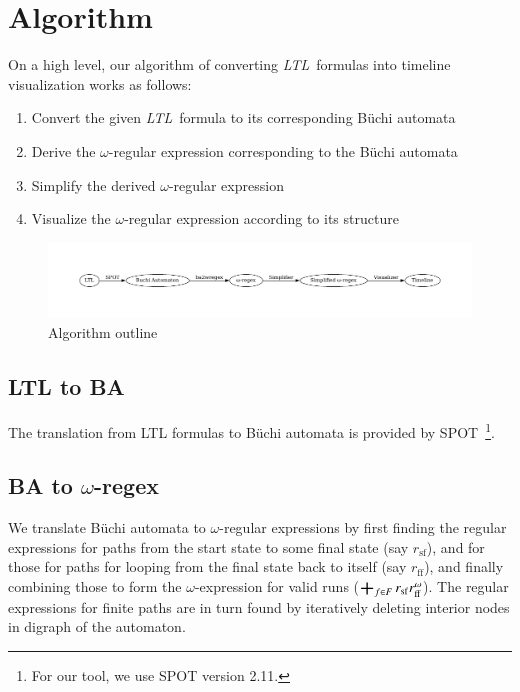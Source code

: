 \documentclass[preprint,12pt]{elsarticle}
\theoremstyle{definition}
\theoremstyle{remark}
\DeclareMathOperator*{\bigplus}{\scalerel*{+}{\sum}}
\newcommand{\ltl}{\textit{LTL}}
\newcommand{\Buchi}{B\"{u}chi }
\begin{document}
\section{Algorithm}
On a high level, our algorithm of converting \ltl\ formulas into timeline visualization works as follows:
\begin{enumerate}
    \item Convert the given \ltl\ formula to its corresponding \Buchi automata %
    \item Derive the $\omega$-regular expression corresponding to the \Buchi automata %
    \item Simplify the derived $\omega$-regular expression %
    \item Visualize the $\omega$-regular expression according to its structure %
\end{enumerate}
\begin{figure}[!h]
    \centering
    \includegraphics[width=\textwidth]{img/algorithm_outline.pdf}
    \caption{Algorithm outline}
    \label{fig:algo}
\end{figure}

\subsection{LTL to BA} \label{ltl2aut}
The translation from LTL formulas to \Buchi automata is provided by SPOT~\cite{Dur22}\footnote{For our tool, we use SPOT version 2.11.}.

\subsection{BA to $\omega$-regex} \label{aut2regex}
We translate \Buchi automata to $\omega$-regular expressions by first finding the regular expressions for paths from the start state to some final state (say $r_\mathrm{sf}$), and for those for paths for looping from the final state back to itself (say $r_\mathrm{ff}$), and finally combining those to form the $\omega$-expression for valid runs ($\bigplus_{f\in F} r_\mathrm{sf}r_\mathrm{ff}^\omega$). The regular expressions for finite paths are in turn found by iteratively deleting interior nodes in digraph of the automaton.
\end{document}
